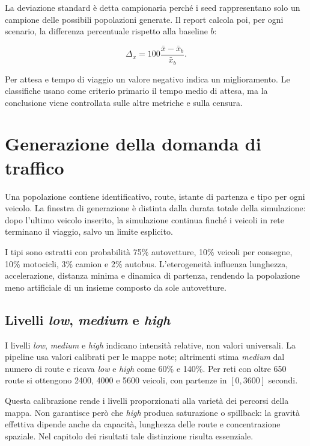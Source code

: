 \documentclass[12pt,a4paper,oneside]{report}
\numberwithin{equation}{chapter}
\begin{document}
La deviazione standard è detta campionaria perché i seed rappresentano solo un
campione delle possibili popolazioni generate. Il report calcola poi, per ogni
scenario, la differenza percentuale rispetto alla baseline $b$:

\begin{equation}
    \Delta_x=100\frac{\bar{x}-\bar{x}_b}{\bar{x}_b}.
    \label{eq:relative-delta}
\end{equation}

Per attesa e tempo di viaggio un valore negativo indica un miglioramento. Le
classifiche usano come criterio primario il tempo medio di attesa, ma la
conclusione viene controllata sulle altre metriche e sulla censura.

\section{Generazione della domanda di traffico}

Una popolazione contiene identificativo, route, istante di partenza e tipo per
ogni veicolo. La finestra di generazione è distinta dalla durata totale della
simulazione: dopo l'ultimo veicolo inserito, la simulazione continua finché i
veicoli in rete terminano il viaggio, salvo un limite esplicito.

I tipi sono estratti con probabilità 75\% autovetture, 10\% veicoli per
consegne, 10\% motocicli, 3\% camion e 2\% autobus. L'eterogeneità influenza
lunghezza, accelerazione, distanza minima e dinamica di partenza, rendendo la
popolazione meno artificiale di un insieme composto da sole autovetture.

\subsection{Livelli \emph{low}, \emph{medium} e \emph{high}}

I livelli \emph{low}, \emph{medium} e \emph{high} indicano intensità
relative, non valori universali. La pipeline usa valori calibrati per le mappe
note; altrimenti stima \emph{medium} dal numero di route e ricava
\emph{low} e \emph{high} come 60\% e 140\%. Per reti con oltre 650 route
si ottengono 2400, 4000 e 5600 veicoli, con partenze in $[0,3600]$ secondi.

Questa calibrazione rende i livelli proporzionati alla varietà dei percorsi
della mappa. Non garantisce però che \emph{high} produca saturazione o spillback:
la gravità effettiva dipende anche da capacità, lunghezza delle route e
concentrazione spaziale. Nel capitolo dei risultati tale distinzione risulta
essenziale.
\end{document}
